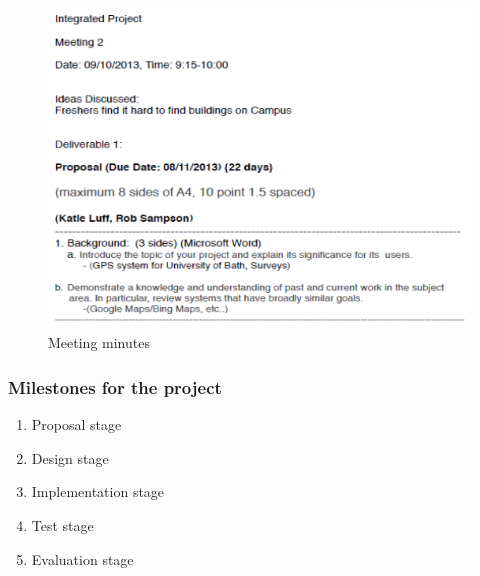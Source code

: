 \documentclass[10pt,a4paper,oneside]{report}
\begin{document}
\begin{figure}[H]
 \centering
 \includegraphics[keepaspectratio, scale=0.5]{meeting.png}
 \caption{Meeting minutes}
\end{figure}

\subsubsection*{Milestones for the project}
\begin{enumerate}
\item{Proposal stage}
\item{Design stage}
\item{Implementation stage}
\item{Test stage}
\item{Evaluation stage}
\end{enumerate}


\end{document}
